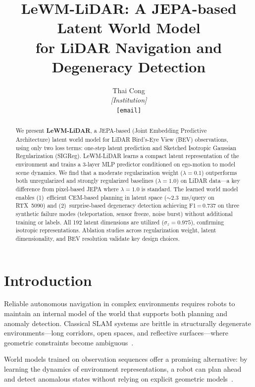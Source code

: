 \documentclass[10pt,twocolumn,letterpaper]{article}
\title{\textbf{LeWM-LiDAR}: A JEPA-based Latent World Model\\
for LiDAR Navigation and Degeneracy Detection}
\author{
  Thai Cong \\
  \textit{[Institution]} \\
  \texttt{[email]}
}
\date{}
\begin{document}
\maketitle

\begin{abstract}
We present \textbf{LeWM-LiDAR}, a JEPA-based (Joint Embedding Predictive
Architecture) latent world model for LiDAR Bird's-Eye View (BEV)
observations, using only two loss terms: one-step latent prediction and
Sketched Isotropic Gaussian Regularization (SIGReg).
LeWM-LiDAR learns a compact latent representation of the environment and
trains a 3-layer MLP predictor conditioned on ego-motion to model scene
dynamics. We find that a moderate regularization weight ($\lambda{=}0.1$)
outperforms both unregularized and strongly regularized baselines
($\lambda{=}1.0$) on LiDAR data—a key difference from pixel-based JEPA
where $\lambda{=}1.0$ is standard. The learned world model enables
(1)~efficient CEM-based planning in latent space (${\sim}$2.3~ms/query on
RTX~5090) and (2)~surprise-based degeneracy detection achieving F1\,=\,0.737
on three synthetic failure modes (teleportation, sensor freeze, noise burst)
without additional training or labels. All 192 latent dimensions are
utilized ($\sigma_z{=}0.975$), confirming isotropic representations.
Ablation studies across regularization weight, latent dimensionality, and
BEV resolution validate key design choices.
\end{abstract}

\section{Introduction}
\label{sec:intro}

Reliable autonomous navigation in complex environments requires robots to
maintain an internal model of the world that supports both planning and
anomaly detection. Classical SLAM systems are brittle in structurally
degenerate environments---long corridors, open spaces, and reflective
surfaces---where geometric constraints become ambiguous~\cite{zhang2016degeneracy}.

World models trained on observation sequences offer a promising alternative:
by learning the dynamics of environment representations, a robot can plan
ahead and detect anomalous states without relying on explicit geometric
models~\cite{hafner2023dreamerv3}.
\end{document}
